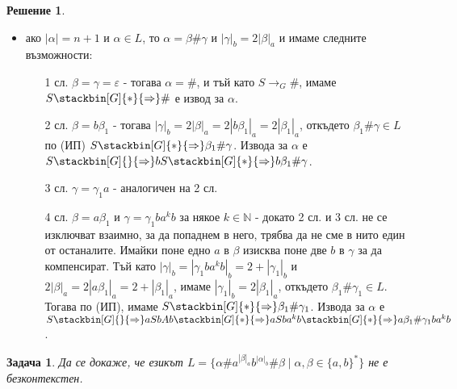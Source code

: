 \documentclass{article}
\newtheorem{problem}{Задача}
\theoremstyle{definition}
\newtheorem*{solution}{Решение}
\newcommand{\der}[1]{\stackbin[G]{#1}{\Rightarrow}}
\begin{document}
\begin{solution}
\begin{itemize}
        \item ако $|\alpha| = n + 1$ и $\alpha \in L$, то $\alpha = \beta \# \gamma$ и $|\gamma|_b = 2|\beta|_a$ и имаме следните възможности:
              \begin{itemize}
                  \item[1 сл.] $\beta = \gamma = \varepsilon$ - тогава $\alpha = \#$, и тъй като $S \rightarrow_G \#$, имаме $S \der{*} \#$ е извод за $\alpha$.
                  \item[2 сл.] $\beta = b \beta_1$ - тогава $|\gamma|_b = 2|\beta|_a = 2|b \beta_1|_a = 2|\beta_1|_a$, откъдето $\beta_1 \# \gamma \in L$ по (ИП) $S \der{*} \beta_1 \# \gamma$.
                      Извода за $\alpha$ е $S \der{} b S \der{*} b \beta_1 \# \gamma$.
                  \item[3 сл.] $\gamma = \gamma_1 a$ - аналогичен на 2 сл.
                  \item[4 сл.] $\beta = a \beta_1$ и $\gamma = \gamma_1 b a^k b$ за някое $k \in \mathbb{N}$ - докато 2 сл. и 3 сл. не се изключват взаимно, за да попаднем в него, трябва да не сме в нито един от останалите.
                      Имайки поне едно $a$ в $\beta$ изисква поне две $b$ в $\gamma$ за да компенсират.
                      Тъй като $|\gamma|_b = |\gamma_1 b a^k b|_b = 2 + |\gamma_1|_b$ и $2|\beta|_a = 2|a \beta_1|_a = 2 + |\beta_1|_a$, имаме $|\gamma_1|_b = 2|\beta_1|_a$, откъдето $\beta_1 \# \gamma_1 \in L$.
                      Тогава по (ИП), имаме $S \der{*} \beta_1 \# \gamma_1$.
                      Извода за $\alpha$ е $S \der{} aSbAb \der{*} aSba^kb \der{*} a \beta_1 \# \gamma_1 b a^k b$.
              \end{itemize}
    \end{itemize}
\end{solution}

\begin{problem}
Да се докаже, че езикът $L = \{ \alpha \# a^{|\beta|_a}  b^{|\alpha|_b} \# \beta \mid \alpha, \beta \in \{a,b\}^\ast \}$ не е безконтекстен.
\end{problem}
\end{document}

